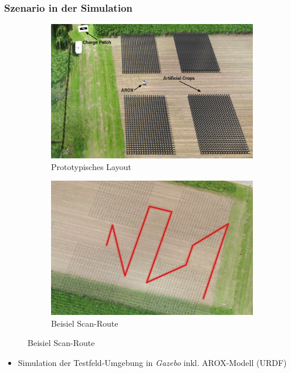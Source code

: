 \documentclass{beamer}
\begin{document}
\begin{frame}
  \frametitle{Szenario in der Simulation}
  \begin{figure}[H]
    \centering
    \begin{subfigure}[b]{0.49\textwidth}
      \centering
      \includegraphics[width=\textwidth]{img/prototype_scenario.jpg}
      \caption*{Prototypisches Layout}
    \end{subfigure}
    \begin{subfigure}[b]{0.49\textwidth}
      \centering
      \includegraphics[width=\textwidth]{img/example_path.png}
      \caption*{Beisiel Scan-Route}
    \end{subfigure}
  \end{figure}
  \begin{itemize}
    \item Simulation der Testfeld-Umgebung in \textit{Gazebo} inkl. AROX-Modell (URDF)
  \end{itemize}
\end{frame}
\end{document}
